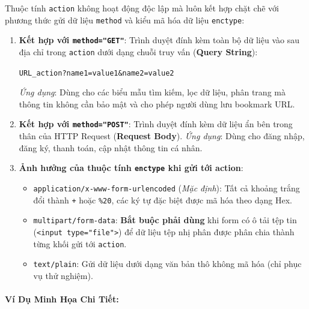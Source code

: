 \documentclass[11pt,oneside]{book}
\newcommand{\codeinline}[1]{\textcolor{accentOrange}{\texttt{#1}}}
\newcommand{\term}[1]{\textbf{\textcolor{primaryBlue}{#1}}}
\begin{document}
Thuộc tính \codeinline{action} không hoạt động độc lập mà luôn kết hợp chặt chẽ với phương thức gửi dữ liệu \codeinline{method} và kiểu mã hóa dữ liệu \codeinline{enctype}:

\begin{enumerate}[leftmargin=1.5em, itemsep=6pt, parsep=0pt]
    \item \textbf{Kết hợp với \codeinline{method="GET"}}:
    Trình duyệt đính kèm toàn bộ dữ liệu vào sau địa chỉ trong \codeinline{action} dưới dạng chuỗi truy vấn (\term{Query String}):
    \begin{center}
    \codeinline{URL\_action?name1=value1\&name2=value2}
    \end{center}
    \textit{Ứng dụng}: Dùng cho các biểu mẫu tìm kiếm, lọc dữ liệu, phân trang mà thông tin không cần bảo mật và cho phép người dùng lưu bookmark URL.

    \item \textbf{Kết hợp với \codeinline{method="POST"}}:
    Trình duyệt đính kèm dữ liệu ẩn bên trong thân của HTTP Request (\term{Request Body}).
    \textit{Ứng dụng}: Dùng cho đăng nhập, đăng ký, thanh toán, cập nhật thông tin cá nhân.

    \item \textbf{Ảnh hưởng của thuộc tính \codeinline{enctype} khi gửi tới action}:
    \begin{itemize}[leftmargin=1.2em, itemsep=2pt]
        \item \codeinline{application/x-www-form-urlencoded} (\textit{Mặc định}): Tất cả khoảng trắng đổi thành \codeinline{+} hoặc \codeinline{\%20}, các ký tự đặc biệt được mã hóa theo dạng Hex.
        \item \codeinline{multipart/form-data}: \textbf{Bắt buộc phải dùng} khi form có ô tải tệp tin (\codeinline{<input type="file">}) để dữ liệu tệp nhị phân được phân chia thành từng khối gửi tới \codeinline{action}.
        \item \codeinline{text/plain}: Gửi dữ liệu dưới dạng văn bản thô không mã hóa (chỉ phục vụ thử nghiệm).
    \end{itemize}
\end{enumerate}

\paragraph{Ví Dụ Minh Họa Chi Tiết:}
\end{document}
